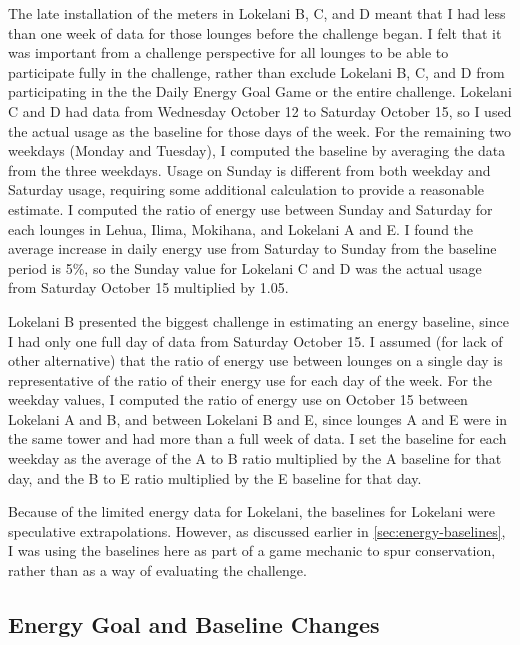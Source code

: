 The late installation of the meters in Lokelani B, C, and D meant that I had less than one week of data for those lounges before the challenge began. I felt that it was important from a challenge perspective for all lounges to be able to participate fully in the challenge, rather than exclude Lokelani B, C, and D from participating in the the Daily Energy Goal Game or the entire challenge. Lokelani C and D had data from Wednesday October 12 to Saturday October 15, so I used the actual usage as the baseline for those days of the week. For the remaining two weekdays (Monday and Tuesday), I computed the baseline by averaging the data from the three weekdays. Usage on Sunday is different from both weekday and Saturday usage, requiring some additional calculation to provide a reasonable estimate. I computed the ratio of energy use between Sunday and Saturday for each lounges in Lehua, Ilima, Mokihana, and Lokelani A and E. I found the average increase in daily energy use from Saturday to Sunday from the baseline period is 5\%, so the Sunday value for Lokelani C and D was the actual usage from Saturday October 15 multiplied by 1.05.

Lokelani B presented the biggest challenge in estimating an energy baseline, since I had only one full day of data from Saturday October 15. I assumed (for lack of other alternative) that the ratio of energy use between lounges on a single day is representative of the ratio of their energy use for each day of the week. For the weekday values, I computed the ratio of energy use on October 15 between Lokelani A and B, and between Lokelani B and E, since lounges A and E were in the same tower and had more than a full week of data. I set the baseline for each weekday as the average of the A to B ratio multiplied by the A  baseline for that day, and the B to E ratio multiplied by the E baseline for that day.

Because of the limited energy data for Lokelani, the baselines for Lokelani were speculative extrapolations. However, as discussed earlier in \autoref{sec:energy-baselines}, I was using the baselines here as part of a game mechanic to spur conservation, rather than as a way of evaluating the challenge.


\subsection{Energy Goal and Baseline Changes}

